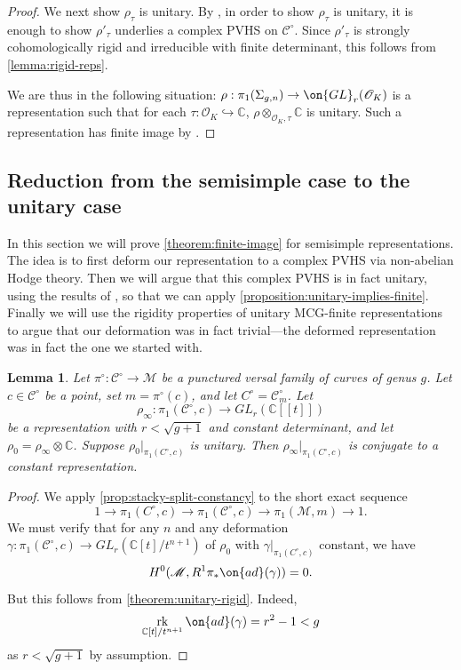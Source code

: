 \documentclass[12 pt]{amsart}
\theoremstyle{plain}
\newtheorem{lemma}[subsubsection]{Lemma}
\theoremstyle{definition}
\theoremstyle{remark}
\numberwithin{equation}{section}
\DeclareMathOperator\rk{rk}
\begin{document}
\begin{proof}
We next show $\rho_\tau$ is unitary.
By \cite[Theorem 1.2.12]{LL:geometric-local-systems}, 
in order to show $\rho_\tau$ is unitary, it is enough to show $\rho'_\tau$ underlies
a complex PVHS on $\mathscr{C}^\circ$.
Since $\rho'_\tau$ is strongly cohomologically rigid and irreducible with finite determinant,
this follows from \autoref{lemma:rigid-reps}.

We are thus in the following situation: $\rho: \pi_1(\Sigma_{g,n})\to \on{GL}_r(\mathscr{O}_K)$ is a representation such that for each $\tau: \mathscr{O}_K\hookrightarrow \mathbb{C}$, $\rho\otimes_{\mathscr{O}_K, \tau} \mathbb{C}$ is unitary. Such a representation has finite image by \cite[Lemma 7.2.1]{LL:geometric-local-systems}.
\end{proof}

\subsection{Reduction from the semisimple case to the unitary case}
\label{subsection:semisimple-case}
In this section we will prove \autoref{theorem:finite-image} for semisimple
representations.
The idea is to first deform our representation to a complex PVHS via
non-abelian Hodge theory. Then we will argue that this complex PVHS is in fact unitary, using the results of \cite{LL:geometric-local-systems}, so that we
can apply \autoref{proposition:unitary-implies-finite}. Finally we will use the rigidity properties of unitary MCG-finite representations to argue 
that our deformation was in fact trivial---the deformed representation was in fact the one we started with.

\begin{lemma}\label{lemma:infinitesmal-rigidity}
Let $\pi^\circ: \mathscr{C}^\circ\to \mathscr{M}$ be a punctured versal family
of curves of genus $g$. Let $c\in \mathscr{C}^\circ$ be a point, set
$m=\pi^\circ(c)$, and let $C^\circ=\mathscr{C}^\circ_m$. Let $$\rho_\infty: \pi_1(\mathscr{C}^\circ, c)\to GL_r(\mathbb{C}[[t]])$$ be a representation with $r<\sqrt{g+1}$ and constant determinant, and let $\rho_0=\rho_\infty\otimes\mathbb{C}$. Suppose $\rho_0|_{\pi_1(C^\circ, c)}$ is unitary. Then $\rho_\infty|_{\pi_1(C^\circ, c)}$ is conjugate to a constant representation.
\end{lemma}
\begin{proof}
	We apply \autoref{prop:stacky-split-constancy} to the short exact sequence $$1\to \pi_1(C^\circ, c)\to \pi_1(\mathscr{C}^\circ, c)\to \pi_1(\mathscr{M},m)\to 1.$$ We must verify that for any $n$ and any deformation $\gamma: \pi_1(\mathscr{C}^\circ, c)\to GL_r(\mathbb{C}[t]/t^{n+1})$ of $\rho_0$ with $\gamma|_{\pi_1(C^\circ, c)}$ constant, we have $$H^0(\mathscr{M}, R^1\pi_*\on{ad}(\gamma))=0.$$ But this follows from \autoref{theorem:unitary-rigid}. Indeed, $$\rk_{\mathbb{C}[t]/t^{n+1}} \on{ad}(\gamma)=r^2-1<g$$ as $r<\sqrt{g+1}$ by assumption.
\end{proof}
\end{document}
